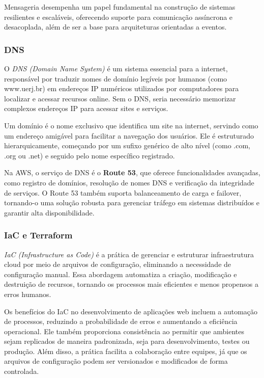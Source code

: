 Mensageria desempenha um papel fundamental na construção de sistemas resilientes e escaláveis, oferecendo suporte para comunicação assíncrona e desacoplada, além de ser a base para arquiteturas orientadas a eventos.

\subsubsection{DNS}


O \emph{DNS (Domain Name System)} é um sistema essencial para a internet, responsável por traduzir nomes de domínio legíveis por humanos (como www.uerj.br) em endereços IP numéricos utilizados por computadores para localizar e acessar recursos online\cite{what-is-dns}. Sem o DNS, seria necessário memorizar complexos endereços IP para acessar sites e serviços.

Um domínio é o nome exclusivo que identifica um site na internet, servindo como um endereço amigável para facilitar a navegação dos usuários. Ele é estruturado hierarquicamente, começando por um sufixo genérico de alto nível (como .com, .org ou .net) e seguido pelo nome específico registrado.

Na AWS, o serviço de DNS é o \textbf{Route 53}, que oferece funcionalidades avançadas, como registro de domínios, resolução de nomes DNS e verificação da integridade de serviços. O Route 53 também suporta balanceamento de carga e failover, tornando-o uma solução robusta para gerenciar tráfego em sistemas distribuídos e garantir alta disponibilidade.

\subsubsection{IaC e Terraform}


\emph{IaC (Infrastructure as Code)} é a prática de gerenciar e estruturar infraestrutura cloud por meio de arquivos de configuração, eliminando a necessidade de configuração manual. Essa abordagem automatiza a criação, modificação e destruição de recursos, tornando os processos mais eficientes e menos propensos a erros humanos\cite{what-is-iac}.

Os benefícios do IaC no desenvolvimento de aplicações web incluem a automação de processos, reduzindo a probabilidade de erros e aumentando a eficiência operacional. Ele também proporciona consistência ao permitir que ambientes sejam replicados de maneira padronizada, seja para desenvolvimento, testes ou produção. Além disso, a prática facilita a colaboração entre equipes, já que os arquivos de configuração podem ser versionados e modificados de forma controlada. 

